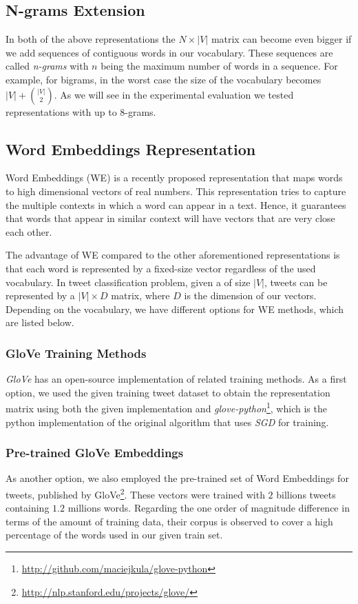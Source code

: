 \subsection{N-grams Extension}
In both of the above representations the $N \times |V|$ matrix
can become even bigger if we add sequences of contiguous words in our vocabulary.
These sequences are called \textit{n-grams} with $n$ being the maximum number of words in a sequence.  
For example, for bigrams, in the worst case the size of the vocabulary becomes $|V| + {|V| \choose 2}$.
As we will see in the experimental evaluation we tested representations with up to 8-grams. 


\subsection{Word Embeddings Representation}
Word Embeddings (WE) \cite{DBLP:journals/corr/MikolovSCCD13} is a recently proposed representation that maps words to high dimensional vectors of real numbers. 
This representation tries to capture the multiple contexts in which a word can appear in a text.
Hence, it guarantees that words that appear in similar context will have vectors that are very close each other.

The advantage of WE compared to the other aforementioned  representations is that each word is represented by a fixed-size vector regardless of the used vocabulary.
In tweet classification problem, given a of size $|V|$, tweets can be represented by a $|V| \times D$ matrix, where $D$ is the dimension of our vectors.
Depending on the vocabulary, we have different options for WE methods, which are listed below.

\subsubsection{GloVe Training Methods}
\textit{GloVe} \cite{pennington2014glove} has an open-source implementation of related training methods.
As a first option, we used the given training tweet dataset to obtain the representation matrix using both the given implementation and \textit{glove-python}\footnote{\url{http://github.com/maciejkula/glove-python}}, which is the python implementation of the original algorithm that uses \textit{SGD} for training.

\subsubsection{Pre-trained GloVe Embeddings}
As another option, we also employed the pre-trained set of Word Embeddings for tweets, published by GloVe\footnote{\url{http://nlp.stanford.edu/projects/glove/}}.
These vectors were trained with $2$ billions tweets containing $1.2$ millions words.
Regarding the one order of magnitude difference in terms of the amount of training data, their corpus is observed to cover a high percentage of the words used in our given train set.


